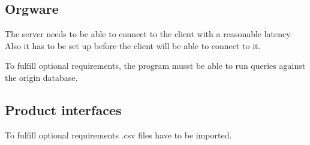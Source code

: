\subsection{Orgware}

The server needs to be able to connect to the client with a reasonable latency.
Also it has to be set up before the client will be able to connect to it.


To fulfill optional requirements, the program musst be able to run queries against
the origin database. 

\subsection{Product interfaces}

To fulfill optional requirements .csv files have to be imported.
